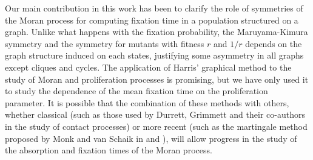 \documentclass[a4paper,english,10pt]{amsart}
\theoremstyle{definition}
\numberwithin{equation}{section}
\begin{document}
Our main contribution in this work has been to clarify the role of symmetries of the Moran process for computing fixation time in a population structured on a graph. Unlike what happens with the fixation probability, the Maruyama-Kimura symmetry and the symmetry for mutants with fitness $r$ and $1/r$ depends on the graph structure induced on each states,  justifying 
some asymmetry in all graphs except cliques and cycles. The application of Harris' graphical method to the study of Moran and proliferation processes is promising, but we have only used it to study the dependence of the mean fixation time on the proliferation parameter. 
It is possible that the combination of these methods with others, whether classical (such as those used by Durrett, Grimmett and their co-authors \cite{Durrettcontact1, Durrettcontact2, Durrettcontact3,Grimmettcontact} in the study of contact processes) or more recent (such as the martingale method proposed by Monk and van Schaik in \cite{Monk2020} and \cite{Monk2021}), will allow progress in the study of the absorption and fixation times of the Moran process.
\end{document}
